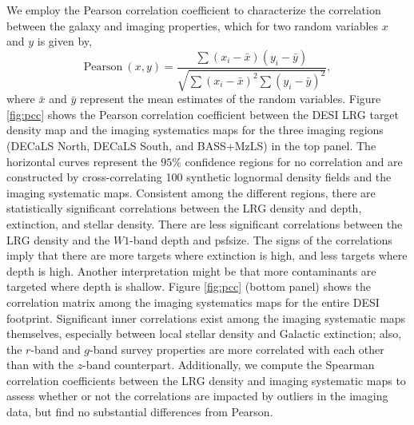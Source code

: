 We employ the Pearson correlation coefficient to characterize the correlation between the galaxy and imaging properties, which for two random variables $x$ and $y$ is given by, 
\begin{equation}
	\text{Pearson}~(x, y) = \frac{\sum (x_{i}-\bar{x})(y_{i}-\bar{y})}{\sqrt{\sum (x_{i}-\bar{x})^{2}\sum (y_{i}-\bar{y})^{2}}},
\end{equation}
where $\bar{x}$ and $\bar{y}$ represent the mean estimates of the random variables. Figure \ref{fig:pcc} shows the Pearson correlation coefficient between the DESI LRG target density map and the imaging systematics maps for the three imaging regions (DECaLS North, DECaLS South, and BASS+MzLS) in the top panel. The horizontal curves represent the $95\%$ confidence regions for no correlation and are constructed by cross-correlating 100 synthetic lognormal density fields and the imaging systematic maps. Consistent among the different regions, there are statistically significant correlations between the LRG density and depth, extinction, and stellar density. There are less significant correlations between the LRG density and the $W1$-band depth and psfsize. The signs of the correlations imply that there are more targets where extinction is high, and less targets where depth is high. Another interpretation might be that more contaminants are targeted where depth is shallow. Figure \ref{fig:pcc} (bottom panel) shows the correlation matrix among the imaging systematics maps for the entire DESI footprint. Significant inner correlations exist among the imaging systematic maps themselves, especially between local stellar density and Galactic extinction; also, the $r$-band and $g$-band survey properties are more correlated with each other than with the $z$-band counterpart. Additionally, we compute the Spearman correlation coefficients between the LRG density and imaging systematic maps to assess whether or not the correlations are impacted by outliers in the imaging data, but find no substantial differences from Pearson.

